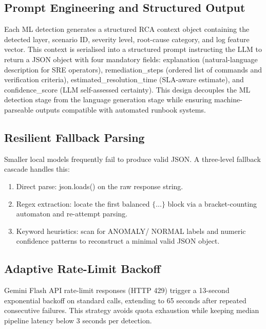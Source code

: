 \documentclass[5p, times]{elsarticle}
\begin{document}
\subsection{Prompt Engineering and Structured Output}
Each ML detection generates a structured RCA context object containing the detected layer, scenario ID, severity level, root-cause category, and log feature vector. This context is serialised into a structured prompt instructing the LLM to return a JSON object with four mandatory fields: explanation (natural-language description for SRE operators), remediation\_steps (ordered list of commands
and verification criteria), estimated\_resolution\_time (SLA-aware estimate), and confidence\_score (LLM self-assessed certainty). This design decouples the ML detection stage from the language generation stage while ensuring machine-parseable outputs compatible with automated runbook systems.

\subsection{Resilient Fallback Parsing}
Smaller local models frequently fail to produce valid JSON. A three-level fallback cascade handles this:
\begin{enumerate}[leftmargin=*, topsep=2pt, itemsep=1pt]
    \item Direct parse: json.loads() on the raw
    response string.
    \item Regex extraction: locate the first balanced
    $\{\ldots\}$ block via a bracket-counting automaton and
    re-attempt parsing.
    \item Keyword heuristics: scan for ANOMALY/
    NORMAL labels and numeric confidence patterns to
    reconstruct a minimal valid JSON object.
\end{enumerate}

\subsection{Adaptive Rate-Limit Backoff}
Gemini Flash API rate-limit responses (HTTP 429) trigger a 13-second exponential backoff on standard calls, extending to 65 seconds after repeated consecutive failures. This strategy avoids quota exhaustion while keeping median pipeline latency
below 3 seconds per detection.
\end{document}
